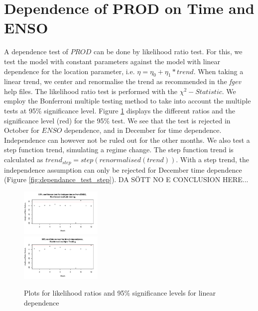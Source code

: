 \documentclass[10pt,conference,compsocconf]{IEEEtran}
\begin{document}
\section*{Dependence of PROD on Time and ENSO}
A dependence test of $PROD$ can be done by likelihood ratio test. For this, we test the model with constant parameters against the model with linear dependence for the location parameter, i.e. $\eta = \eta_0 + \eta_1*trend$. When taking a linear trend, we center and renormalise the trend  as recommended in the \textit{fgev} help files. The likelihood ratio test is performed with the $\chi^2-Statistic$. We employ the Bonferroni multiple testing method to take into account the multiple tests at 95\% significance level. Figure \ref{fig:dependance_test} displays the different ratios and the significance level (red) for the 95\% test. We see that the test is rejected in October for $ENSO$ dependence, and in December for time dependence. Independence can however not be ruled out for the other months. We also test a step function trend, simulating a regime change. The step function trend is calculated as $trend_{step} = step(renormalised(trend))$. With a step trend, the independence assumption can only be rejected for December time dependence (Figure \ref{fig:dependance_test_step}).
DA SÖTT NO E CONCLUSION HERE...

\begin{figure}
	\centering
	\includegraphics[width=0.35\textwidth]{../plots/enso_dependance.pdf}\\
	\includegraphics[width=0.35\textwidth]{../plots/time_dependance.pdf}
	\caption{Plots for likelihood ratios and 95\% significance levels for linear dependence}
	\label{fig:dependance_test}
\end{figure}
\end{document}
